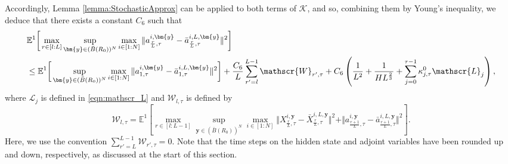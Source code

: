 \documentclass{article}
\begin{document}
\begin{appendices}
Accordingly, Lemma \ref{lemma:StochasticApprox} can be applied to both terms of $\mathcal K$, and so, combining them by Young's inequality, we deduce that there exists a constant $C_6$ such that
\begin{align}\label{eqn:boundaintermediate}
&\mathbb E^1 \bigg[\max_{r\in[l:L]}\sup_{\bm{y}\in (\bar B(R_0))^N}\max_{i\in[1:N]}\Vert a^{i,\bm{y}}_{\frac{r}{L},\tau} - \bar a^{i,L,\bm{y}}_{\frac{r}{L},\tau}\Vert^2\bigg] \\&\le \mathbb E^1 \bigg[\sup_{\bm{y}\in (\bar B(R_0))^N}\max_{i\in[1:N]} \Vert a^{i,\bm{y}}_{1,\tau} - \bar a^{i,L,\bm{y}}_{1,\tau}\Vert^2 \bigg]  +\frac{C_6}{L}\sum_{r'=l}^{L-1} \mathscr{W}_{r',\tau} +C_6\left(\frac{1}{L^2}+\frac{1}{HL^{\frac{2}{3}}}+\sum_{j=0}^{\tau-1}\kappa^0_{j,\tau}\mathscr{L}_j\right), \notag
\end{align}
where $\mathscr{L}_j$ is defined in \eqref{eqn:mathscr_L} and $\mathscr{W}_{l,\tau}$ is defined by
\begin{equation}
    \mathscr{W}_{l,\tau} = \mathbb E^1\left[\max_{r\in[l:L-1]}\sup_{\bm{y}\in (\bar B(R_0))^N}\max_{i\in[1:N]}\Vert X^{i,\bm{y}}_{\frac{r}{L},\tau}-\bar X^{i,L,\bm{y}}_{\frac{r}{L},\tau}\Vert^2+\Vert a^{i,\bm{y}}_{\frac{r+1}{L},\tau}-\bar a^{i,L,\bm{y}}_{\frac{r+1}{L},\tau}\Vert^2 \right].
\end{equation}
Here, we use the convention $\sum_{r'=L}^{L-1} \mathscr{W}_{r',\tau}=0$. Note that the time steps on the hidden state and adjoint variables have been rounded up and down, respectively, as discussed at the start of this section.\\


\end{appendices}
\end{document}
